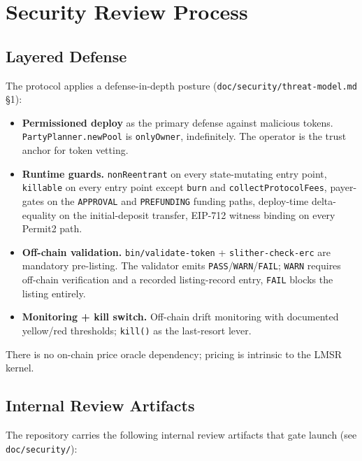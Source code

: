 \documentclass[11pt]{article}
\begin{document}
\section{Security Review Process}
\label{sec:security}

\subsection{Layered Defense}

The protocol applies a defense-in-depth posture
(\texttt{doc/\allowbreak security/\allowbreak threat-model.md} \S1):

\begin{itemize}
  \item \textbf{Permissioned deploy} as the primary defense against
        malicious tokens. \texttt{PartyPlanner.\allowbreak newPool} is
        \texttt{onlyOwner}, indefinitely. The operator is the trust
        anchor for token vetting.
  \item \textbf{Runtime guards.} \texttt{nonReentrant} on every state-mutating
        entry point, \texttt{killable} on every entry point except
        \texttt{burn} and \texttt{collectProtocolFees}, payer-gates on the
        \texttt{APPROVAL} and
        \texttt{PREFUNDING} funding paths, deploy-time delta-equality on the
        initial-deposit transfer, EIP-712 witness binding on every Permit2
        path.
  \item \textbf{Off-chain validation.} \texttt{bin/validate-token} +
        \texttt{slither-check-erc} are mandatory pre-listing. The validator
        emits \texttt{PASS}/\texttt{WARN}/\texttt{FAIL}; \texttt{WARN}
        requires off-chain verification and a recorded listing-record entry,
        \texttt{FAIL} blocks the listing entirely.
  \item \textbf{Monitoring + kill switch.} Off-chain drift monitoring with
        documented yellow/red thresholds; \texttt{kill()} as the last-resort
        lever.
\end{itemize}

There is no on-chain price oracle dependency; pricing is intrinsic to the
LMSR kernel.

\subsection{Internal Review Artifacts}

The repository carries the following internal review artifacts that gate
launch (see \texttt{doc/security/}):
\end{document}
